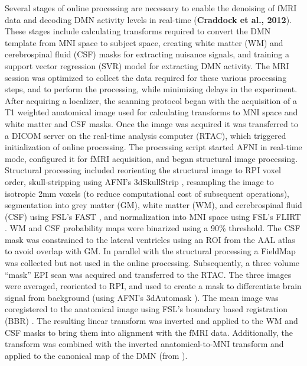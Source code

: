 Several stages of online processing are necessary to enable the denoising of fMRI data and decoding DMN activity levels in real-time (\textbf{Craddock et al., 2012}). These stages include calculating transforms required to convert the DMN template from MNI space to subject space, creating white matter (WM) and cerebrospinal fluid (CSF) masks for extracting nuisance signals, and training a support vector regression (SVR) model for extracting DMN activity. The MRI session was optimized to collect the data required for these various processing steps, and to perform the processing, while minimizing delays in the experiment.
After acquiring a localizer, the scanning protocol began with the acquisition of a T1 weighted anatomical image used for calculating transforms to MNI space and white matter and CSF masks. Once the image was acquired it was transferred to a DICOM server on the real-time analysis computer (RTAC), which triggered initialization of online processing. The processing script started AFNI in real-time mode, configured it for fMRI acquisition, and began structural image processing. Structural processing included reorienting the structural image to RPI voxel order, skull-stripping using AFNI's 3dSkullStrip \cite{Cox1996}, resampling the image to isotropic 2mm voxels (to reduce computational cost of subsequent operations), segmentation into grey matter (GM), white matter (WM), and cerebrospinal fluid (CSF) using FSL's FAST \cite{Zhang2001}, and normalization into MNI space using FSL's FLIRT \cite{Jenkinson2001,Jenkinson2002}. WM and CSF probability maps were binarized using a 90\% threshold. The CSF mask was constrained to the lateral ventricles using an ROI from the AAL atlas to avoid overlap with GM.
In parallel with the structural processing a FieldMap was collected but not used in the online processing. Subsequently, a three volume ``mask'' EPI scan was acquired and transferred to the RTAC. The three images were averaged, reoriented to RPI, and used to create a mask to differentiate brain signal from background (using AFNI's 3dAutomask \cite{Cox1996}). The mean image was coregistered to the anatomical image using FSL's boundary based registration (BBR) \cite{Greve2009}. The resulting linear transform was inverted and applied to the WM and CSF masks to bring them into alignment with the fMRI data. Additionally, the transform was combined with the inverted anatomical-to-MNI transform and applied to the canonical map of the DMN (from \cite{Smith2009a}).

